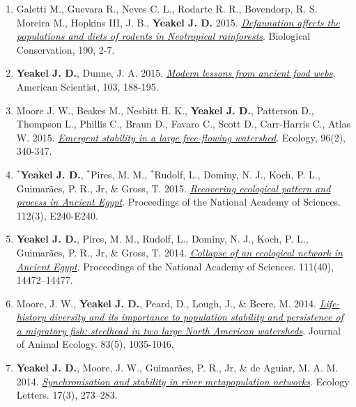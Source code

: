 \documentclass[margin,line,12pt]{res}
\begin{document}
\begin{resume}
\begin{enumerate}
\item Galetti M., Guevara R., Neves C. L., Rodarte R. R., Bovendorp, R. S. Moreira M., Hopkins III, J. B., \textbf{Yeakel J. D.} 2015. \href{https://www.sciencedirect.com/science/article/abs/pii/S000632071500186X}{\emph{Defaunation affects the populations and diets of rodents in Neotropical rainforests}}. Biological Conservation, 190, 2-7.

\item \textbf{Yeakel J. D.}, Dunne, J. A. 2015. \href{https://www.americanscientist.org/article/modern-lessons-from-ancient-food-webs}{\emph{Modern lessons from ancient food webs}}. American Scientist, 103, 188-195.

\item Moore J. W., Beakes M., Nesbitt H. K., \textbf{Yeakel J. D.}, Patterson D., Thompson L., Phillis C., Braun D., Favaro C., Scott D., Carr-Harris C., Atlas W. 2015. \href{https://esajournals.onlinelibrary.wiley.com/doi/full/10.1890/14-0326.1}{\emph{Emergent stability in a large free-flowing watershed}}. Ecology, 96(2), 340-347.

\item \textbf{${}^\ast$Yeakel J. D.}, ${}^\ast$Pires, M. M., ${}^\ast$Rudolf, L., Dominy, N. J., Koch, P. L., Guimar\~aes, P. R., Jr,
\& Gross, T. 2015. \href{https://www.pnas.org/content/early/2015/01/07/1422646112}{\emph{Recovering ecological pattern and process in Ancient Egypt}}. Proceedings of the National Academy of Sciences. 112(3), E240-E240.

\item \textbf{Yeakel J. D.}, Pires, M. M., Rudolf, L., Dominy, N. J., Koch, P. L., Guimar\~aes, P. R., Jr, \& Gross, T. 2014. \href{https://www.pnas.org/content/111/40/14472}{\emph{Collapse of an ecological network in Ancient Egypt}}. Proceedings of the National Academy of Sciences. 111(40), 14472–14477.

\item Moore, J. W., \textbf{Yeakel J. D.}, Peard, D., Lough, J., \& Beere, M. 2014. \href{https://besjournals.onlinelibrary.wiley.com/doi/10.1111/1365-2656.12212}{\emph{Life-history diversity and its importance to population stability and persistence of a migratory fish: steelhead in two large North American watersheds}}. Journal of Animal Ecology. 83(5), 1035-1046.

\item \textbf{Yeakel J. D.}, Moore, J. W., Guimar\~aes, P. R., Jr, \& de Aguiar, M. A. M. 2014. \href{https://onlinelibrary.wiley.com/doi/abs/10.1111/ele.12228}{\emph{Synchronisation and stability in river metapopulation networks}}. Ecology Letters. 17(3), 273–283.


\end{enumerate}
\end{resume}
\end{document}
